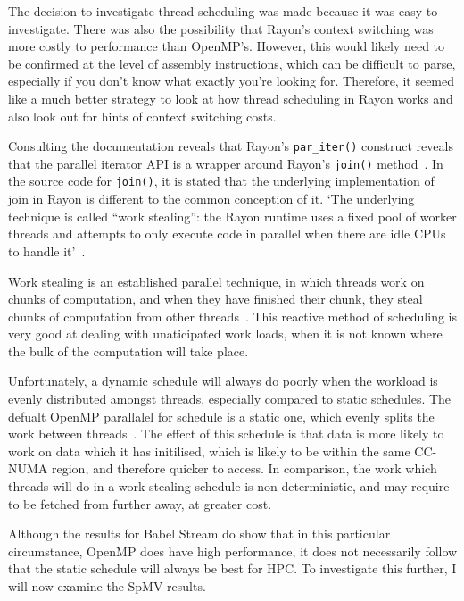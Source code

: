 The decision to investigate thread scheduling was made because it was easy to investigate. There was also the possibility that Rayon's context switching was more costly to performance than OpenMP's. However, this would likely need to be confirmed at the level of assembly instructions, which can be difficult to parse, especially if you don't know what exactly you're looking for. Therefore, it seemed like a much better strategy to look at how thread scheduling in Rayon works  and also look out for hints of context switching costs.

Consulting the documentation reveals that Rayon's \texttt{par\_iter()} construct reveals that the parallel iterator API is a wrapper around Rayon's \texttt{join()} method~\cite{smallCult}. In the source code for \texttt{join()}, it is stated that the underlying implementation of join in Rayon is different to the common conception of it. 
`The underlying technique is called ``work stealing'': the
Rayon runtime uses a fixed pool of worker threads and attempts to only execute code in parallel when there are idle CPUs to handle it'~\cite{joinSrc}.

Work stealing is an established parallel technique, in which threads work on chunks of computation, and when they have finished their chunk, they steal chunks of computation from other threads~\cite{blumofe1999}. This reactive method of scheduling is very good at dealing with unaticipated work loads, when it is not known where the bulk of the computation will take place.

Unfortunately, a dynamic schedule will always do poorly when the workload is evenly distributed amongst threads, especially compared to static schedules. The defualt OpenMP parallalel for schedule is a static one, which evenly splits the work between threads~\cite{OpenMPSpec5}. The effect of this schedule is that data is more likely to work on data which it has initilised, which is likely to be within the same CC-NUMA region, and therefore quicker to access. In comparison, the work which threads will do in a work stealing schedule is non deterministic, and may require to be fetched from further away, at greater cost.

Although the results for Babel Stream do show that in this particular circumstance, OpenMP does have high performance, it does not necessarily follow that the static schedule will always be best for HPC\@. To investigate this further, I will now examine the SpMV results.
